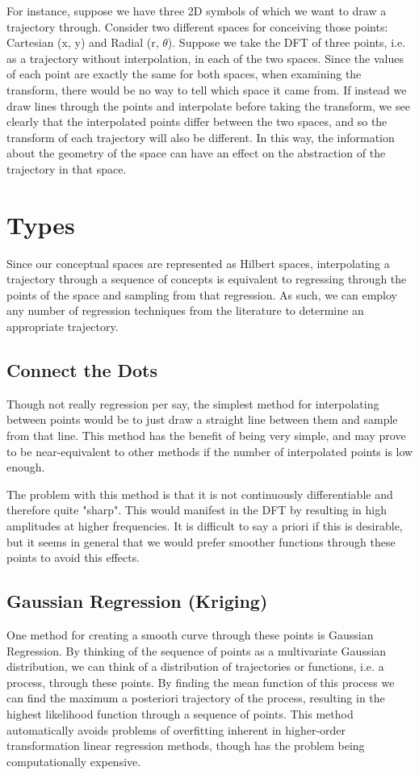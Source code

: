 For instance, suppose we have three 2D symbols of which we want to draw a trajectory through. Consider two different spaces for conceiving those points: Cartesian (x, y) and Radial (r, $\theta$). Suppose we take the DFT of three points, i.e. as a trajectory without interpolation, in each of the two spaces.  Since the values of each point are exactly the same for both spaces, when examining the transform, there would be no way to tell which space it came from.  If instead we draw lines through the points and interpolate before taking the transform, we see clearly that the interpolated points differ between the two spaces, and so the transform of each trajectory will also be different.  In this way, the information about the geometry of the space can have an effect on the abstraction of the trajectory in that space.

\section{Types}
Since our conceptual spaces are represented as Hilbert spaces, interpolating a trajectory through a sequence of concepts is equivalent to regressing through the points of the space and sampling from that regression.  As such, we can employ any number of regression techniques from the literature to determine an appropriate trajectory.

\subsection{Connect the Dots}
Though not really regression per say, the simplest method for interpolating between points would be to just draw a straight line between them and sample from that line.  This method has the benefit of being very simple, and may prove to be near-equivalent to other methods if the number of interpolated points is low enough.

The problem with this method is that it is not continuously differentiable and therefore quite "sharp".  This would manifest in the DFT by resulting in high amplitudes at higher frequencies.  It is difficult to say a priori if this is desirable, but it seems in general that we would prefer smoother functions through these points to avoid this effects.

\subsection{Gaussian Regression (Kriging)}
One method for creating a smooth curve through these points is Gaussian Regression.  By thinking of the sequence of points as a multivariate Gaussian distribution, we can think of a distribution of trajectories or functions, i.e. a process, through these points.  By finding the mean function of this process we can find the maximum a posteriori trajectory of the process, resulting in the highest likelihood function through a sequence of points.  This method automatically avoids problems of overfitting inherent in higher-order transformation linear regression methods, though has the problem being computationally expensive.

